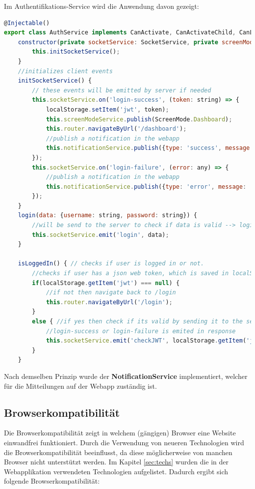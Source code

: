 \clearpage
Im Authentifikations-Service wird die Anwendung davon gezeigt:
\lstset{escapechar=?,style=customjava}
\begin{lstlisting}[language=javascript, caption=AuthService ist für die Client-seitige Authentifizierung zuständig]
@Injectable()
export class AuthService implements CanActivate, CanActivateChild, CanLoad {
    constructor(private socketService: SocketService, private screenModeService: ScreenModeService, private notificationService: NotificationService) {
        this.initSocketService();
    }
    //initializes client events
    initSocketService() {
        // these events will be emitted by server if needed
        this.socketService.on('login-success', (token: string) => {
            localStorage.setItem('jwt', token);
            this.screenModeService.publish(ScreenMode.Dashboard);
            this.router.navigateByUrl('/dashboard');
            //publish a notification in the webapp
            this.notificationService.publish({type: 'success', message: 'Erfolgreich angemeldet!'});
        });
        this.socketService.on('login-failure', (error: any) => {
            //publish a notification in the webapp
            this.notificationService.publish({type: 'error', message: 'Anmeldung fehlgeschlagen!'});
        });
    }    
    login(data: {username: string, password: string}) {
        //will be send to the server to check if data is valid --> login-success or login-failure is emitted in response
        this.socketService.emit('login', data); 
    }
    
    isLoggedIn() { // checks if user is logged in or not.
        //checks if user has a json web token, which is saved in localStorage
        if(localStorage.getItem('jwt') === null) {
            //if not then navigate back to /login
            this.router.navigateByUrl('/login');
        }
        else { //if yes then check if its valid by sending it to the server
            //login-success or login-failure is emited in response
            this.socketService.emit('checkJWT', localStorage.getItem('jwt'));
        }
    }
\end{lstlisting}
\lstset{escapechar=@,style=customjava}
Nach demselben Prinzip wurde der \textbf{NotificationService} implementiert, welcher für die Mitteilungen auf der Webapp zuständig ist.

\subsection{Browserkompatibilität}
Die Browserkompatibilität zeigt in welchem (gängigen) Browser eine Website einwandfrei funktioniert. Durch die Verwendung von neueren Technologien wird die Browserkompatibilität beeinflusst, da diese möglicherweise von manchen Browser nicht unterstützt werden. Im Kapitel \ref{sec:techs} wurden die in der Webapplikation verwendeten Technologien aufgelistet. Dadurch ergibt sich folgende Browserkompatibilität:

